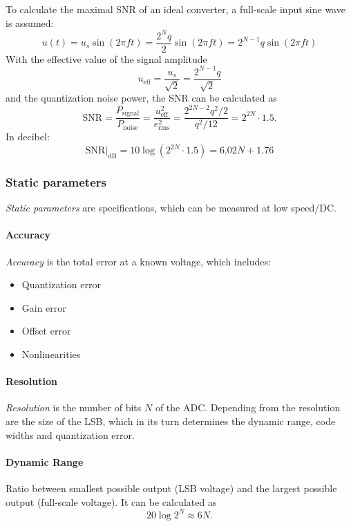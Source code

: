 To calculate the maximal SNR of an ideal converter, a full-scale input sine wave is assumed:
\begin{equation}
u(t) = u_s \sin(2\pi f t) = \frac{2^{N}q}{2}\sin(2\pi f t)  = 2^{N-1}q \sin(2\pi f t)
\end{equation}
With the effective value of the signal amplitude
\begin{equation}
u_{\text{eff}} = \frac{u_s}{\sqrt{2}} = \frac{2^{N-1}q}{\sqrt{2}}
\end{equation}
and the quantization noise power, the SNR can be calculated as
\begin{equation}
\text{SNR} = \frac{P_{\text{signal}}}{P_{\text{noise}}} = \frac{u_{\text{eff}}^{2}}{e_{\text{rms}}^{2}} = \frac{2^{2N-2}q^2/2}{q^2/12} = 2^{2N} \cdot 1.5.
\end{equation}
In decibel:
\begin{equation}
\text{SNR}|_{\text{dB}} = 10\log\left(2^{2N}\cdot 1.5\right) = 6.02 N + 1.76
\end{equation}
\cite{puente2015} \cite{walt}


\subsubsection{Static parameters}
\textit{Static parameters} are specifications, which can be measured at low speed/DC. 
\paragraph{Accuracy}
\textit{Accuracy} is the total error at a known voltage, which includes:
\begin{itemize}[noitemsep]
	\item Quantization error
	\item Gain error
	\item Offset error
	\item Nonlinearities
\end{itemize}

\paragraph{Resolution}
\textit{Resolution} is the number of bits $N$ of the ADC. Depending from the resolution are the size of the LSB, which in its turn determines the dynamic range, code widths and quantization error.

\paragraph{Dynamic Range}
Ratio between smallest possible output (LSB voltage) and the largest possible output (full-scale voltage). It can be calculated as
\begin{equation}
	20 \log 2^{N} \approx 6N.
\end{equation}


